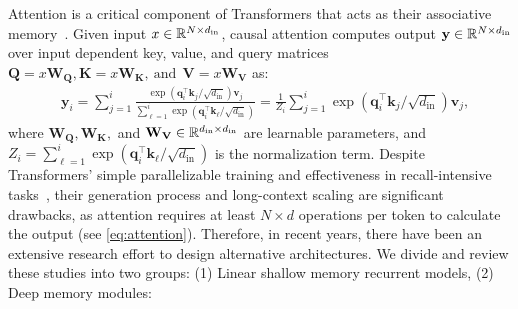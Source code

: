 Attention is a critical component of Transformers that acts as their associative memory~\citep{bietti2023birth, sun2024learning, behrouz2025Miras}. Given input $x \in \mathbb{R}^{N \times d_{\text{in}}}$, causal attention computes output $\mathbf{y} \in \mathbb{R}^{N \times d_{\text{in}}}$ over input dependent key, value, and query matrices $\mathbf{Q} = x \mathbf{W}_{\mathbf{Q}}, \mathbf{K} = x \mathbf{W}_{\mathbf{K}}, \: \text{and}\:\: \mathbf{V} = x \mathbf{W}_{\mathbf{V}}$ as:
\begin{align}\label{eq:attention}
    &\mathbf{y}_i = \sum_{j = 1}^{i} \frac{ \exp\left( \mathbf{q}_i^{\top} \mathbf{k}_j/\sqrt{d_{\text{in}}}\right) \mathbf{v}_j }{\sum_{\ell = 1}^{i} \exp\left( \mathbf{q}_i^{\top} \mathbf{k}_{\ell}/\sqrt{d_{\text{in}}}\right)} =  \frac{1}{Z_i} \sum_{j = 1}^{i} \exp\left( \mathbf{q}_i^{\top} \mathbf{k}_j/\sqrt{d_{\text{in}}}\right) \mathbf{v}_j,
\end{align}
where $\mathbf{W}_{\mathbf{Q}}, \mathbf{W}_{\mathbf{K}},$ and $\mathbf{W}_{\mathbf{V}} \in \mathbb{R}^{d_{\text{in}} \times d_{\text{in}}}$ are learnable parameters, and $Z_i = {\sum_{\ell = 1}^{i} \exp\left( \mathbf{q}_i^{\top} \mathbf{k}_{\ell}/\sqrt{d_{\text{in}}}\right)}$ is the normalization term. Despite Transformers' simple parallelizable training and effectiveness in recall-intensive tasks~\citep{arora2024simple}, their generation process and long-context scaling are significant drawbacks, as attention requires at least
$N\times d$ operations per token to calculate the output (see \autoref{eq:attention}). Therefore, in recent years, there have been an extensive research effort to design alternative architectures. We divide and review these studies into two groups: (1) Linear shallow memory recurrent models, (2) Deep memory modules:


